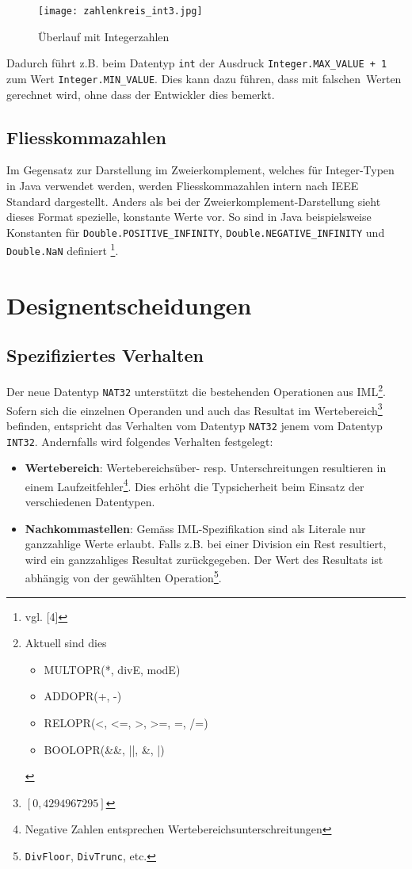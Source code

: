 \documentclass[10pt, a4paper, twocolumn]{article} %
\begin{document}
\begin{figure}[H]
    \texttt{[image: zahlenkreis\_int3.jpg]}
    \caption{Überlauf mit Integerzahlen}
    \label{zahlenkreis}
\end{figure}

Dadurch führt z.B. beim Datentyp \texttt{int} der Ausdruck \texttt{Integer.MAX\_VALUE + 1} zum Wert \texttt{Integer.MIN\_VALUE}.
Dies kann dazu führen, dass mit \glqq falschen\grqq \ Werten gerechnet wird, ohne dass der Entwickler dies bemerkt.

\subsection{Fliesskommazahlen}
\label{ieee}
Im Gegensatz zur Darstellung im Zweierkomplement, welches für Integer-Typen in Java verwendet werden, werden Fliesskommazahlen intern nach IEEE Standard dargestellt.
Anders als bei der Zweierkomplement-Darstellung sieht dieses Format spezielle, konstante Werte vor.
So sind in Java beispielsweise Konstanten für \texttt{Double.POSITIVE\_INFINITY}, \texttt{Double.NEGATIVE\_INFINITY} und \texttt{Double.NaN} definiert \footnote{vgl. [4]}.

\section{Designentscheidungen}
\subsection{Spezifiziertes Verhalten}
Der neue Datentyp \texttt{NAT32} unterstützt die bestehenden Operationen aus IML\footnote{Aktuell sind dies \begin{itemize}
                                                                                                                \item MULTOPR(*, divE, modE) \item ADDOPR(+, -) \item RELOPR(<, <=, >, >=, =, /=) \item BOOLOPR(\&\&, ||, \&, |)
\end{itemize}}.
Sofern sich die einzelnen Operanden und auch das Resultat im Wertebereich\footnote{$[0,4294967295]$} befinden,
entspricht das Verhalten vom Datentyp \texttt{NAT32} jenem vom Datentyp \texttt{INT32}.
Andernfalls wird folgendes Verhalten festgelegt:

\begin{itemize}
    \item \textbf{Wertebereich}: Wertebereichsüber- resp. Unterschreitungen resultieren in einem Laufzeitfehler\footnote{Negative Zahlen entsprechen Wertebereichsunterschreitungen}. Dies erhöht die Typsicherheit beim Einsatz der verschiedenen Datentypen.
    \item \textbf{Nachkommastellen}: Gemäss IML-Spezifikation sind als Literale nur ganzzahlige Werte erlaubt. Falls z.B. bei einer Division ein Rest resultiert, wird ein ganzzahliges Resultat zurückgegeben. Der Wert des Resultats ist abhängig von der gewählten Operation\footnote{\texttt{DivFloor}, \texttt{DivTrunc}, etc.}.
\end{itemize}
\end{document}
